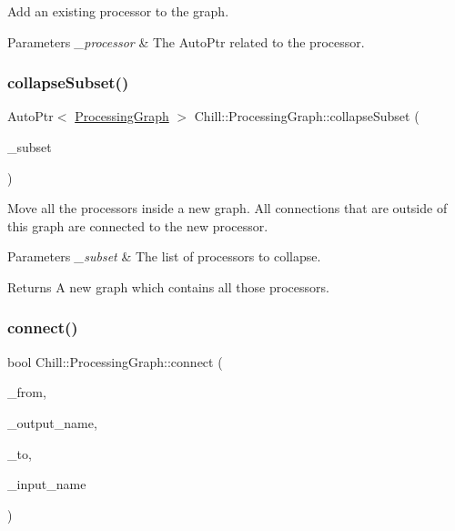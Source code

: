 Add an existing processor to the graph. 
\begin{DoxyParams}{Parameters}
{\em \+\_\+processor} & The Auto\+Ptr related to the processor. \\
\hline
\end{DoxyParams}
\mbox{\label{class_chill_1_1_processing_graph_ad7554bc478052d49fc37d8d15e29827b}} 
\subsubsection{\texorpdfstring{collapse\+Subset()}{collapseSubset()}}
{\footnotesize\ttfamily Auto\+Ptr$<$ \mbox{\hyperlink{class_chill_1_1_processing_graph}{Processing\+Graph}} $>$ Chill\+::\+Processing\+Graph\+::collapse\+Subset (\begin{DoxyParamCaption}\item[{const std\+::vector$<$ Auto\+Ptr$<$ \mbox{\hyperlink{class_chill_1_1_processor}{Processor}} $>$$>$ \&}]{\+\_\+subset }\end{DoxyParamCaption})}

Move all the processors inside a new graph. All connections that are outside of this graph are connected to the new processor. 
\begin{DoxyParams}{Parameters}
{\em \+\_\+subset} & The list of processors to collapse. \\
\hline
\end{DoxyParams}
\begin{DoxyReturn}{Returns}
A new graph which contains all those processors. 
\end{DoxyReturn}
\mbox{\label{class_chill_1_1_processing_graph_a5af6528fa4dd66f6c59dc6144a70d4c3}} 
\subsubsection{\texorpdfstring{connect()}{connect()}\hspace{0.1cm}{\footnotesize\ttfamily [1/2]}}
{\footnotesize\ttfamily bool Chill\+::\+Processing\+Graph\+::connect (\begin{DoxyParamCaption}\item[{const Auto\+Ptr$<$ \mbox{\hyperlink{class_chill_1_1_processor}{Processor}} $>$ \&}]{\+\_\+from,  }\item[{const std\+::string}]{\+\_\+output\+\_\+name,  }\item[{const Auto\+Ptr$<$ \mbox{\hyperlink{class_chill_1_1_processor}{Processor}} $>$ \&}]{\+\_\+to,  }\item[{const std\+::string}]{\+\_\+input\+\_\+name }\end{DoxyParamCaption})\hspace{0.3cm}{\ttfamily [static]}}

